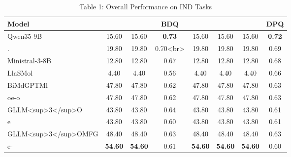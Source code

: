 \begin{table}[t]
\centering
\caption{Table 1: Overall Performance on IND Tasks}
\label{tab:2610.18851}
\begin{tabular}{lccccccc}
\toprule
Model &  &  & BDQ &  &  &  & DPQ \\
\midrule
Qwen35-9B & 15.60 & 15.60 & \textbf{0.73} & 15.60 & 15.60 & 15.60 & \textbf{0.72} \\
. & 19.80 & 19.80 & 0.70<br> & 19.80 & 19.80 & 19.80 & 0.69 \\
Ministral-3-8B & 12.80 & 12.80 & 0.67 & 12.80 & 12.80 & 12.80 & 0.68 \\
LlaSMol & 4.40 & 4.40 & 0.56 & 4.40 & 4.40 & 4.40 & 0.66 \\
BiMdGPTMl & 47.80 & 47.80 & 0.62 & 47.80 & 47.80 & 47.80 & 0.63 \\
oe-o & 47.80 & 47.80 & 0.62 & 47.80 & 47.80 & 47.80 & 0.63 \\
GLLM<sup>3</sup>O & 43.80 & 43.80 & 0.64 & 43.80 & 43.80 & 43.80 & 0.61 \\
e & 43.80 & 43.80 & 0.60 & 43.80 & 43.80 & 43.80 & 0.61 \\
GLLM<sup>3</sup>OMFG & 48.40 & 48.40 & 0.63 & 48.40 & 48.40 & 48.40 & 0.63 \\
e- & \textbf{54.60} & \textbf{54.60} & 0.61 & \textbf{54.60} & \textbf{54.60} & \textbf{54.60} & 0.60 \\
\bottomrule
\end{tabular}
\end{table}
